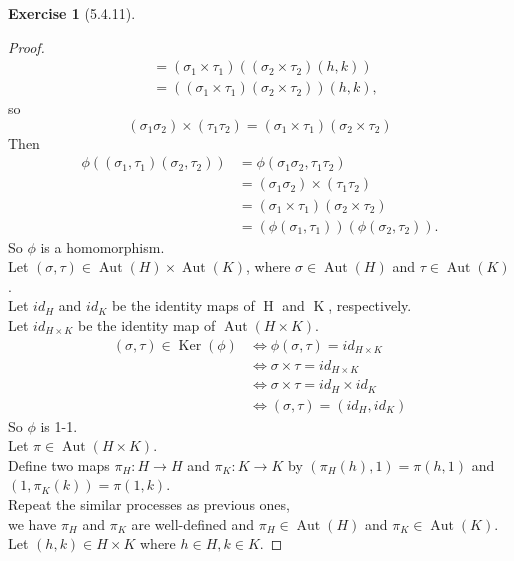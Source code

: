 \documentclass{amsart}
\renewcommand{\ker}{\operatorname{Ker}}
\theoremstyle{plain}
\theoremstyle{definition}
\newtheorem{exer}[lem]{Exercise}
\begin{document}
\begin{exer}[5.4.11]
\begin{proof}
\begin{align*}
	 												  &=(\sigma_1 \times \tau_1) \left((\sigma_2 \times \tau_2)(h,k)\right) \\
	 												  &=\left((\sigma_1 \times \tau_1) (\sigma_2 \times \tau_2)\right)(h,k), 
   \end{align*}
   so
   \[(\sigma_1\sigma_2)\times (\tau_1\tau_2) = (\sigma_1 \times \tau_1) (\sigma_2 \times \tau_2)\]
   Then
   \begin{align*}
   	 \phi\left((\sigma_1,\tau_1)(\sigma_2,\tau_2)\right) &= \phi (\sigma_1\sigma_2,\tau_1\tau_2)\\
   	 													 &=(\sigma_1\sigma_2) \times (\tau_1\tau_2) \\
   	 													 &=(\sigma_1 \times \tau_1) (\sigma_2 \times \tau_2) \\
   	 													 &=\left(\phi(\sigma_1,\tau_1)\right)\left(\phi(\sigma_2,\tau_2)\right).
   \end{align*}
   So $\phi$ is a homomorphism.\\
   Let $(\sigma,\tau) \in \operatorname{Aut}(H) \times \operatorname{Aut}(K)$, where $\sigma \in \operatorname{Aut}(H)$ and $\tau \in \operatorname{Aut}(K)$.\\
   Let $id_H$ and $id_K$ be the identity maps of $\operatorname{H}$ and $\operatorname{K}$, respectively.\\
   Let $id_{H\times K}$ be the identity map of $\operatorname{Aut}(H\times K)$.
   \begin{align*}
	 (\sigma,\tau) \in \ker(\phi) &\Leftrightarrow \phi(\sigma,\tau) = id_{H \times K} \\
	 							  &\Leftrightarrow \sigma\times \tau = id_{H \times K}\\
	 							  &\Leftrightarrow \sigma \times \tau = id_{H} \times id_{K} \\
	 							  &\Leftrightarrow (\sigma,\tau) = (id_{H},id_{K})
   \end{align*}
	So $\phi$ is 1-1.\\
	Let $\pi \in \operatorname{Aut}(H \times K)$.\\
	Define two maps $\pi_H:H\to H$ and $\pi_K: K\to K$ by $\left(\pi_H(h),1\right) = \pi(h,1)$ and $ \left(1,\pi_K(k)\right) = \pi(1,k)$.\\
	Repeat the similar processes as previous ones, \\
	we have $\pi_H$ and $\pi_K$ are well-defined and $\pi_H \in \operatorname{Aut}(H)$ and $\pi_K \in \operatorname{Aut}(K)$.\\
	Let $(h,k) \in H \times K$ where $h \in H, k \in K$.

\end{proof}
\end{exer}
\end{document}
